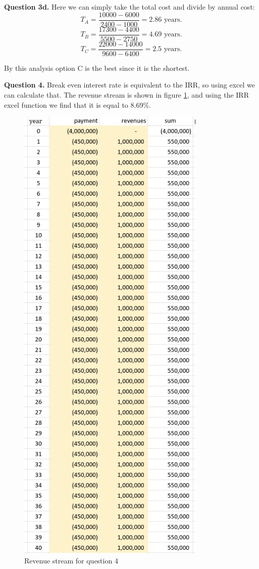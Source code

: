 \documentclass[letterpaper, reqno,11pt]{article}
\begin{document}
{\noindent\bf Question 3d.} Here we can simply take the total cost and divide by annual cost: 
\[
T_A=\frac{10000-6000}{2400-1000}=2.86\text{ years}
.\]
\[
T_B=\frac{17300-4400}{5500-2750}=4.69\text{ years}
.\]
\[
T_C=\frac{22000-14000}{9600-6400}=2.5\text{ years}
.\]

By this analysis option C is the best since it is the shortest. 

{\noindent\bf Question 4.} Break even interest rate is equivalent to the IRR, so using excel we can calculate that. The revenue stream is shown in figure \ref{fig:q4}, and using the IRR excel function we find that it is equal to 8.69\%. 

\begin{figure}[htpb]
    \centering
    \includegraphics[width=0.8\textwidth]{q4}
    \caption{Revenue stream for question 4}
    \label{fig:q4}
\end{figure}
\end{document}
